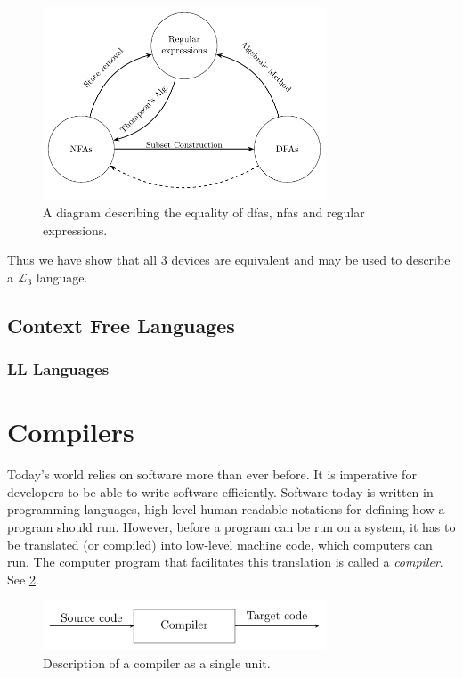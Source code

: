 \begin{figure}[H]\label{fig:conversion}
  \centering
  \includegraphics[width=0.75\textwidth]{figures/conversion.pdf}
  \caption{A diagram describing the equality of \glspl{dfa}, \glspl{nfa} and regular expressions.}
\end{figure}

Thus we have show that all 3 devices are equivalent and may be used to describe a $\mathcal{L}_3$ language.


\subsection{Context Free Languages} 


\subsubsection{LL Languages}



  


\section{Compilers}\label{sec:compilers}
Today's world relies on software more than ever before. It is imperative for developers to be able to write software efficiently. Software today is written in programming languages, high-level human-readable notations for defining how a program should run. However, before a program can be run on a system, it has to be translated (or compiled) into low-level machine code, which computers can run. The computer program that facilitates this translation is called a \emph{compiler}. See \cref{fig:compiler}.

\begin{figure}[H]\label{fig:compiler}
  \centering
  \includegraphics[width=0.75\textwidth]{figures/compiler.pdf}
  \caption{Description of a compiler as a single unit.}
\end{figure}



